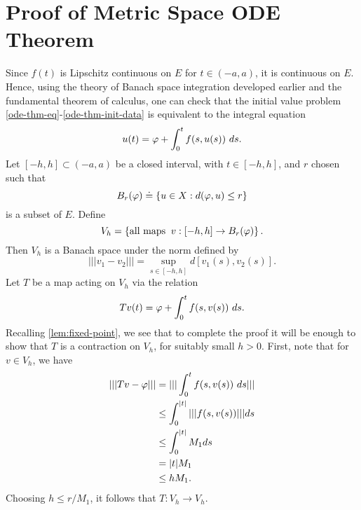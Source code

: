 \section{Proof of Metric Space ODE Theorem}
	Since $f(t)$ is Lipschitz continuous on $E$ for $t \in (-a, a)$, it is
	continuous on $E$. Hence, using the theory of Banach space integration
  developed earlier and the fundamental theorem of calculus,
  one can check that the initial value problem
  \eqref{ode-thm-eq}-\eqref{ode-thm-init-data} is equivalent to the
	integral equation
	\begin{equation*}
		\begin{split}
			u(t) = \varphi + \int_0^t f(s, u(s) ) \ ds.
		\end{split}
	\end{equation*}
	Let $[-h, h] \subset (-a, a)$ be a closed interval, with $t \in [-h, h]$,
	and $r$ chosen such that
	$$B_r(\varphi) \doteq \left\{ u \in X: d(\varphi, u) \le r \right\}$$
	is a subset of $E$. Define 
	$$V_h = \left\{ \text{all maps} \; \;  v: [-h, h]
		\to B_r(\varphi)\right\}.$$ Then $V_h$ is a Banach
		space under the norm defined by $$| | | v_1 - v_2 | | | = \sup_{s \in [-h,
    h]} d[v_1(s),v_2(s)].$$ Let $T$ be a map
	acting on $V_h$ via the relation $$Tv(t) = \varphi + \int_0^t f(s, v(s) ) \ ds.$$
	Recalling \autoref{lem:fixed-point}, we see that to complete the proof it will be enough to show that $T$ is a contraction on
	$V_h$, for suitably small $h >0$. First, note that for $v \in V_h$, we have
\begin{equation}
	\label{cont-map-into}
	\begin{split}
		| | | Tv - \varphi| | |
		& = | | | \int_0^t f(s, v(s) ) \ ds | | |
		\\
    & \le  \int_0^{|t|} | | | f(s, v(s) ) | | | ds
		\\
    & \le   \int_0^{|t|} M_1 ds
		\\
		& =  |t| M_1
		\\
		& \le  h M_1.
	\end{split}
\end{equation}
%
%
Choosing $h \le r/M_1$, it follows that $T: V_h \to V_h$. 

